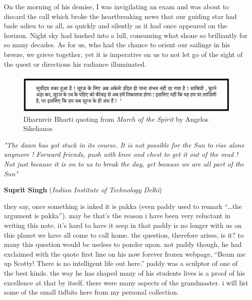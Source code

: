 \documentclass[prd, preprint, longbibliography, 11pt]{revtex4-1}
\begin{document}
On the morning of his demise, I was invigilating an exam and was about to discard the call which broke the heartbreaking  news that our guiding star had bade adieu to us all, as quickly and silently as it had once appeared on the horizon. Night sky had hushed into a lull, consuming what shone so brilliantly for so many decades. As for us, who had the chance to orient our sailings in his breeze, we grieve together, yet it is imperative on us to not let go of the sight of the quest or directions his radiance illuminated.

\begin{figure}[!h]
\centering
\includegraphics[width=12.00cm]{sanskrit2.png}
\caption*{Dharmvir Bharti 
quoting from \textit{March of the Spirit} by Angelos Sikelianos}
\end{figure}

\noindent \textit{"The dawn has got stuck in its course. It is not possible for the Sun to rise alone anymore ! 
 Forward friends, push with knee and chest to get it out of the mud !
 Not just because it is on to us to break the day, yet because we are all part of the Sun"}
 
\bigskip

\bigskip

\bigskip

\centerline{{\bf Suprit Singh} ({\it Indian Institute of Technology Delhi})}
\medskip
{}

\noindent they say, once something is inked it is pakka (even paddy used to remark “…the argument is pakka”). may be that’s the reason i have been very reluctant in writing this note. it’s hard to have it seep in that paddy is no longer with us on this planet we have all come to call home. the question, therefore arises, is it? to many this question would be useless to ponder upon. not paddy though, he had exclaimed with the quote first line on his now forever frozen webpage, “Beam me up Scotty! There is no intelligent life out here.”  paddy was a sculptor of one of the best kinds. the way he has shaped many of his students lives is a proof of his excellence at that by itself.  there were many aspects of the grandmaster. i will list some of the small tidbits here from my personal collection. 
\end{document}
